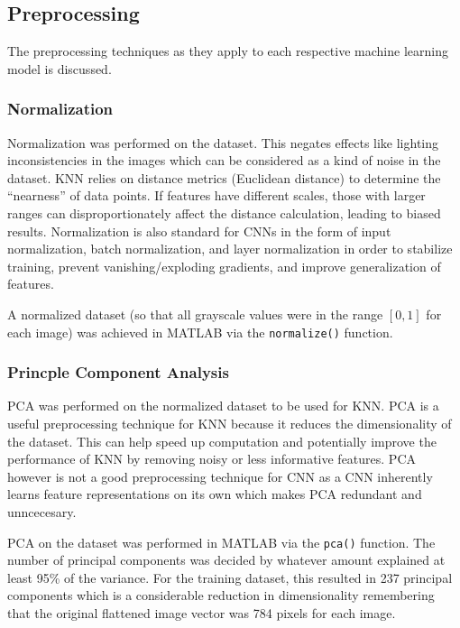 \documentclass{article}
\begin{document}
\subsection{Preprocessing}

The preprocessing techniques as they apply to each respective machine learning
model is discussed.

\subsubsection{Normalization}

Normalization was performed on the dataset. This negates effects like lighting
inconsistencies in the images which can be considered as a kind of noise in the
dataset. KNN relies on distance metrics (Euclidean distance) to determine the
“nearness” of data points. If features have different scales, those with larger
ranges can disproportionately affect the distance calculation, leading to biased
results. Normalization is also standard for CNNs in the form of input
normalization, batch normalization, and layer normalization in order to
stabilize training, prevent vanishing/exploding gradients, and improve
generalization of features.

A normalized dataset (so that all grayscale values were in the range \( [0, 1]\)
for each image) was achieved in MATLAB via the \texttt{normalize()} function.

\subsubsection{Princple Component Analysis}

PCA was performed on the normalized dataset to be used for KNN. PCA is a useful
preprocessing technique for KNN because it reduces the dimensionality of the
dataset. This can help speed up computation and potentially improve the
performance of KNN by removing noisy or less informative features. PCA
however is not a good preprocessing technique for CNN as a CNN inherently learns
feature representations on its own which makes PCA redundant and unncecesary.

PCA on the dataset was performed in MATLAB via the \texttt{pca()} function. The
number of principal components was decided by whatever amount explained at least
95\% of the variance. For the training dataset, this resulted in 237 principal
components which is a considerable reduction in dimensionality remembering that
the original flattened image vector was 784 pixels for each image.
\end{document}
